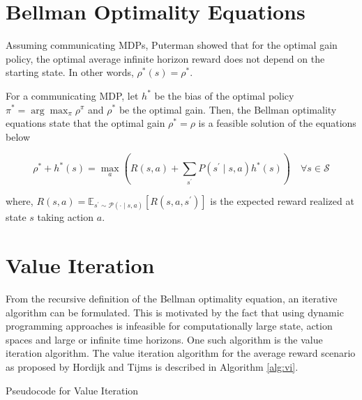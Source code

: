 \section{Bellman Optimality Equations}

Assuming communicating MDPs, Puterman \cite{puterman_chapter_1990} showed that for the optimal gain policy, the optimal average infinite horizon reward does not depend on the starting state. In other words, $\rho^*(s) = \rho^*$.

For a communicating MDP, let $h^*$ be the bias of the optimal policy $\pi^* = \arg \max_\pi \rho^\pi$ and $\rho^*$ be the optimal gain. 
Then, the Bellman optimality equations state that the optimal gain $\rho^* = \rho$ is a feasible solution of the equations below 

\begin{equation}
    \rho^* + h^*(s) = \max_a \left( R(s, a) + \sum_{s^\prime} P(s^\prime \mid s, a) h^*(s) \right) \quad \forall s \in \mathcal{S}
\end{equation}

where, $R(s,a) = \mathbb{E}_{s^\prime \sim \mathcal{P}(\cdot \mid s, a)}\left[ R(s, a, s^\prime) \right]$ is the expected reward realized at state $s$ taking action $a$.

\section{Value Iteration}

From the recursive definition of the Bellman optimality equation, an iterative algorithm can be formulated. 
This is motivated by the fact that using dynamic programming approaches is infeasible for computationally large state, action spaces and large or infinite time horizons.
One such algorithm is the value iteration algorithm. The value iteration algorithm for the average reward scenario as proposed by Hordijk and Tijms \cite{hordijk_modified_1975} is described in Algorithm \ref{alg:vi}.

\begin{algorithm}[!htbp]
    
    
    \BlankLine
    \BlankLine
    \caption{Pseudocode for Value Iteration}\label{alg:vi}
\end{algorithm}

